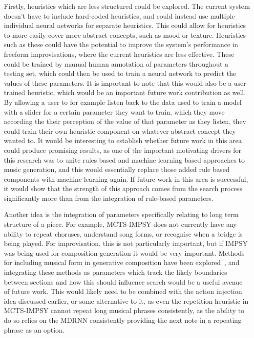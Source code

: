 Firstly, heuristics which are less structured could be explored. The current system doesn't have to include hard-coded heuristics, and could instead use multiple individual neural networks for separate heuristics. This could allow for heuristics to more easily cover more abstract concepts, such as mood or texture. Heuristics such as these could have the potential to improve the system's performance in freeform improvisations, where the current heuristics are less effective. These could be trained by manual human annotation of parameters throughout a testing set, which could then be used to train a neural network to predict the values of these parameters. It is important to note that this would also be a user trained heuristic, which would be an important future work contribution as well. By allowing a user to for example listen back to the data used to train a model with a slider for a certain parameter they want to train, which they move according the their perception of the value of that parameter as they listen, they could train their own heuristic component on whatever abstract concept they wanted to. It would be interesting to establish whether future work in this area could produce promising results, as one of the important motivating drivers for this research was to unite rules based and machine learning based approaches to music generation, and this would essentially replace those added rule based components with machine learning again. If future work in this area is successful, it would show that the strength of this approach comes from the search process significantly more than from the integration of rule-based parameters.

Another idea is the integration of parameters specifically relating to long term structure of a piece. For example, MCTS-IMPSY does not currently have any ability to repeat choruses, understand song forms, or recognise when a bridge is being played. For improvisation, this is not particularly important, but if IMPSY was being used for composition generation it would be very important. Methods for including musical form in generative composition have been explored~\citep{Collins2009MusicalForm}, and integrating these methods as parameters which track the likely boundaries between sections and how this should influence search would be a useful avenue of future work. This would likely need to be combined with the action injection idea discussed earlier, or some alternative to it, as even the repetition heuristic in MCTS-IMPSY cannot repeat long musical phrases consistently, as the ability to do so relies on the MDRNN consistently providing the next note in a repeating phrase as an option.

